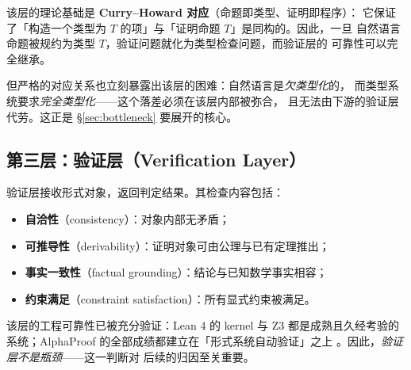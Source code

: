 \documentclass[UTF8,a4paper,11pt]{ctexart}
\begin{document}
该层的理论基础是 \textbf{Curry--Howard 对应}（命题即类型、证明即程序）：
它保证了「构造一个类型为 $T$ 的项」与「证明命题 $T$」是同构的。因此，一旦
自然语言命题被规约为类型 $T$，验证问题就化为类型检查问题，而验证层的
可靠性可以完全继承。

但严格的对应关系也立刻暴露出该层的困难：自然语言是\emph{欠类型化}的，
而类型系统要求\emph{完全类型化}——这个落差必须在该层内部被弥合，
且无法由下游的验证层代劳。这正是 \S\ref{sec:bottleneck} 要展开的核心。

\subsection{第三层：验证层（Verification Layer）}

验证层接收形式对象，返回判定结果。其检查内容包括：
\begin{itemize}[leftmargin=1.6em,itemsep=2pt]
  \item \textbf{自洽性}（consistency）：对象内部无矛盾；
  \item \textbf{可推导性}（derivability）：证明对象可由公理与已有定理推出；
  \item \textbf{事实一致性}（factual grounding）：结论与已知数学事实相容；
  \item \textbf{约束满足}（constraint satisfaction）：所有显式约束被满足。
\end{itemize}

该层的工程可靠性已被充分验证：Lean 4 的 kernel
\citep{demoura2021lean4} 与 Z3 \citep{demoura2008z3} 都是成熟且久经考验的
系统；AlphaProof 的全部成绩都建立在「形式系统自动验证」之上
\citep{hubert2025alphaproof}。因此，\emph{验证层不是瓶颈}——这一判断对
后续的归因至关重要。
\end{document}
